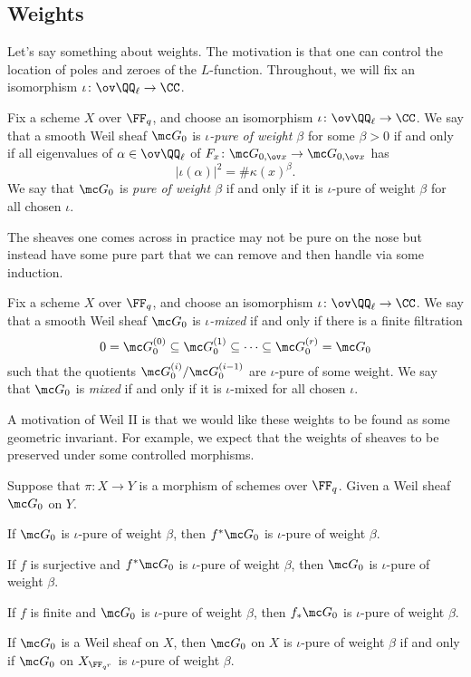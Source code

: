 \documentclass[../notes.tex]{subfiles}
\begin{document}
\subsection{Weights}
Let's say something about weights. The motivation is that one can control the location of poles and zeroes of the $L$-function. Throughout, we will fix an isomorphism $\iota\colon\ov\QQ_\ell\to\CC$.
\begin{definition}[pure]
	Fix a scheme $X$ over $\FF_q$, and choose an isomorphism $\iota\colon\ov\QQ_\ell\to\CC$. We say that a smooth Weil sheaf $\mc G_0$ is \textit{$\iota$-pure of weight $\beta$} for some $\beta>0$ if and only if all eigenvalues of $\alpha\in\ov\QQ_\ell$ of $F_x\colon\mc G_{0,\ov x}\to\mc G_{0,\ov x}$ has
	\[\left|\iota(\alpha)\right|^2=\#\kappa(x)^\beta.\]
	We say that $\mc G_0$ is \textit{pure of weight $\beta$} if and only if it is $\iota$-pure of weight $\beta$ for all chosen $\iota$.
\end{definition}
The sheaves one comes across in practice may not be pure on the nose but instead have some pure part that we can remove and then handle via some induction.
\begin{definition}[mixed]
	Fix a scheme $X$ over $\FF_q$, and choose an isomorphism $\iota\colon\ov\QQ_\ell\to\CC$. We say that a smooth Weil sheaf $\mc G_0$ is \textit{$\iota$-mixed} if and only if there is a finite filtration
	\[0=\mc G_0^{(0)}\subseteq\mc G_0^{(1)}\subseteq\cdots\subseteq\mc G_0^{(r)}=\mc G_0\]
	such that the quotients $\mc G_0^{(i)}/\mc G_{0}^{(i-1)}$ are $\iota$-pure of some weight. We say that $\mc G_0$ is \textit{mixed} if and only if it is $\iota$-mixed for all chosen $\iota$.
\end{definition}
A motivation of Weil II is that we would like these weights to be found as some geometric invariant. For example, we expect that the weights of sheaves to be preserved under some controlled morphisms.
\begin{proposition}
	Suppose that $\pi\colon X\to Y$ is a morphism of schemes over $\FF_q$. Given a Weil sheaf $\mc G_0$ on $Y$.
	\begin{listalph}
		\item If $\mc G_0$ is $\iota$-pure of weight $\beta$, then $f^*\mc G_0$ is $\iota$-pure of weight $\beta$.
		\item If $f$ is surjective and $f^*\mc G_0$ is $\iota$-pure of weight $\beta$, then $\mc G_0$ is $\iota$-pure of weight $\beta$.
		\item If $f$ is finite and $\mc G_0$ is $\iota$-pure of weight $\beta$, then $f_*\mc G_0$ is $\iota$-pure of weight $\beta$.
		\item If $\mc G_0$ is a Weil sheaf on $X$, then $\mc G_0$ on $X$ is $\iota$-pure of weight $\beta$ if and only if $\mc G_0$ on $X_{\FF_{q^r}}$ is $\iota$-pure of weight $\beta$.
	\end{listalph}
\end{proposition}
\end{document}
